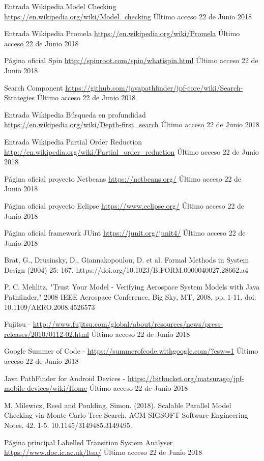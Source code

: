 \documentclass[runningheads]{llncs}
\begin{document}
\begin{thebibliography}{8}

Entrada Wikipedia Model Checking \url{https://en.wikipedia.org/wiki/Model\_checking} \'Ultimo acceso 22 de Junio 2018

Entrada Wikipedia Promela \url{https://en.wikipedia.org/wiki/Promela} \'Ultimo acceso 22 de Junio 2018

P\'agina oficial Spin \url{http://spinroot.com/spin/whatispin.html} \'Ultimo acceso 22 de Junio 2018

Search Component \url{https://github.com/javapathfinder/jpf-core/wiki/Search-Strategies} \'Ultimo acceso 22 de Junio 2018

Entrada Wikipedia B\'usqueda en profundidad \url{https://en.wikipedia.org/wiki/Depth-first\_search} \'Ultimo acceso 22 de Junio 2018

Entrada Wikipedia Partial Order Reduction \url{http://en.wikipedia.org/wiki/Partial\_order\_reduction} \'Ultimo acceso 22 de Junio 2018

P\'agina oficial proyecto Netbeans \url{https://netbeans.org/} \'Ultimo acceso 22 de Junio 2018

P\'agina oficial proyecto Eclipse \url{https://www.eclipse.org/} \'Ultimo acceso 22 de Junio 2018

P\'agina oficial framework JUint \url{https://junit.org/junit4/} \'Ultimo acceso 22 de Junio 2018

Brat, G., Drusinsky, D., Giannakopoulou, D. et al. Formal Methods in System Design (2004) 25: 167. https://doi.org/10.1023/B:FORM.0000040027.28662.a4

P. C. Mehlitz, "Trust Your Model - Verifying Aerospace System Models with Java Pathfinder," 2008 IEEE Aerospace Conference, Big Sky, MT, 2008, pp. 1-11.
doi: 10.1109/AERO.2008.4526573

Fujitsu - \url{http://www.fujitsu.com/global/about/resources/news/press-releases/2010/0112-02.html} \'Ultimo acceso 22 de Junio 2018

Google Summer of Code - \url{https://summerofcode.withgoogle.com/?csw=1} \'Ultimo acceso 22 de Junio 2018

Java PathFinder for Android Devices - \url{https://bitbucket.org/matsurago/jpf-mobile-devices/wiki/Home} \'Ultimo acceso 22 de Junio 2018

M. Milewicz, Reed and Poulding, Simon. (2018). Scalable Parallel Model Checking via Monte-Carlo Tree Search. ACM SIGSOFT Software Engineering Notes. 42. 1-5. 10.1145/3149485.3149495. 

P\'agina principal Labelled Transition System Analyser
 \url{https://www.doc.ic.ac.uk/ltsa/} \'Ultimo acceso 22 de Junio 2018


\end{thebibliography}
\end{document}
